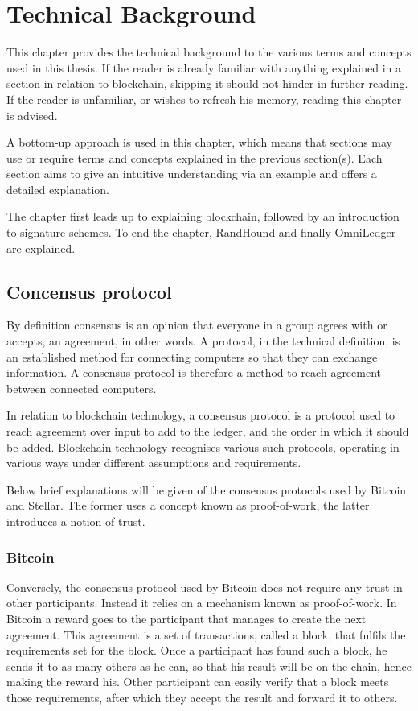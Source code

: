\chapter{Technical Background}
This chapter provides the technical background to the various terms and concepts used in this thesis. If the reader is already familiar with anything explained in a section in relation to blockchain, skipping it should not hinder in further reading. If the reader is unfamiliar, or wishes to refresh his memory, reading this chapter is advised.

A bottom-up approach is used in this chapter, which means that sections may use or require terms and concepts explained in the previous section(s). Each section aims to give an intuitive understanding via an example and offers a detailed explanation.

The chapter first leads up to explaining blockchain, followed by an introduction to signature schemes. To end the chapter, RandHound and finally OmniLedger are explained.

\section{Concensus protocol} \label{Consensus}
By definition consensus is an opinion that everyone in a group agrees with or accepts, an agreement, in other words. A protocol, in the technical definition, is an established method for connecting computers so that they can exchange information. A consensus protocol is therefore a method to reach agreement between connected computers.

In relation to blockchain technology, a consensus protocol \cite{IBMConsensus} is a protocol used to reach agreement over input to add to the ledger, and the order in which it should be added. Blockchain technology recognises various such protocols, operating in various ways under different assumptions and requirements.

Below brief explanations will be given of the consensus protocols used by Bitcoin and Stellar. The former uses a concept known as proof-of-work, the latter introduces a notion of trust.

\subsection{Bitcoin}
Conversely, the consensus protocol used by Bitcoin \cite{Bitcoin} does not require any trust in other participants. Instead it relies on a mechanism known as proof-of-work. In Bitcoin a reward goes to the participant that manages to create the next agreement. This agreement is a set of transactions, called a block, that fulfils the requirements set for the block. Once a participant has found such a block, he sends it to as many others as he can, so that his result will be on the chain, hence making the reward his. Other participant can easily verify that a block meets those requirements, after which they accept the result and forward it to others.

